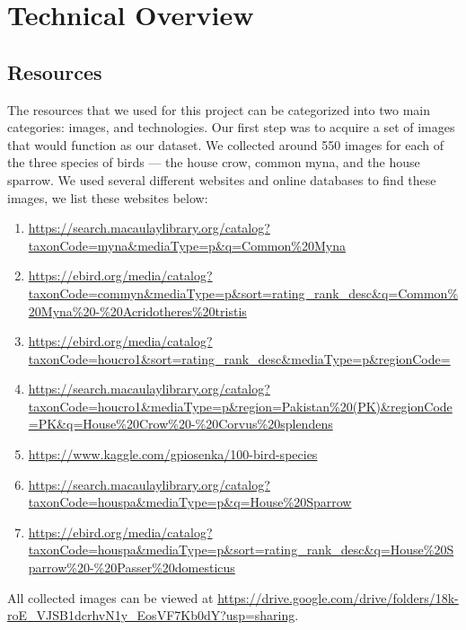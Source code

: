 \documentclass[11pt]{article}
\begin{document}
\section{Technical Overview}
\subsection{Resources}
  The resources that we used for this project can be categorized into two main 
  categories: images, and technologies. Our first step was to acquire a set of images that would 
  function as our dataset. We collected around 550 images for each of the three 
  species of birds --- the house crow, common myna, and the house sparrow. We used 
  several different websites and online databases to find these images, we list 
  these websites below: 
  \begin{enumerate}
    \item \url{https://search.macaulaylibrary.org/catalog?taxonCode=myna&mediaType=p&q=Common\%20Myna}
    \item \url{https://ebird.org/media/catalog?taxonCode=commyn&mediaType=p&sort=rating_rank_desc&q=Common\%20Myna\%20-\%20Acridotheres\%20tristis}
    \item \url{https://ebird.org/media/catalog?taxonCode=houcro1&sort=rating_rank_desc&mediaType=p&regionCode=}
    \item \url{https://search.macaulaylibrary.org/catalog?taxonCode=houcro1&mediaType=p&region=Pakistan\%20(PK)&regionCode=PK&q=House\%20Crow\%20-\%20Corvus\%20splendens}
    \item \url{https://www.kaggle.com/gpiosenka/100-bird-species}
    \item \url{https://search.macaulaylibrary.org/catalog?taxonCode=houspa&mediaType=p&q=House\%20Sparrow}
    \item \url{https://ebird.org/media/catalog?taxonCode=houspa&mediaType=p&sort=rating_rank_desc&q=House\%20Sparrow\%20-\%20Passer\%20domesticus}
    \label{imagelinks}
  \end{enumerate}
  \setlength{\parskip}{1em}
  All collected images can be viewed at \url{https://drive.google.com/drive/folders/18k-roE_VJSB1dcrhvN1y_EosVF7Kb0dY?usp=sharing}.
\end{document}
